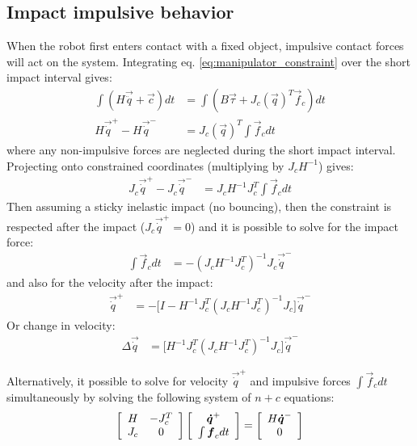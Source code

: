 \subsection{Impact impulsive behavior}
\label{sec:impact}
%
When the robot first enters contact with a fixed object, impulsive contact forces will act on the system. Integrating eq. \eqref{eq:manipulator_constraint} over the short impact interval gives:
%
\begin{align}
\int{ ( H \vec{\ddot{q}} + \vec{c} ) dt } &= \int{ ( B \vec{\tau} + J_c( \vec{ q } )^T  \vec{f}_c ) dt } \\
H \vec{\dot{q}}^+ - H \vec{\dot{q}}^- &= J_c( \vec{ q } )^T  \int{  \vec{f}_c dt }
\label{eq:manipulator_impact}
\end{align}
%
where any non-impulsive forces are neglected during the short impact interval. Projecting onto constrained coordinates (multiplying by $J_c H^{-1}$) gives:
%
\begin{align}
J_c \vec{\dot{q}}^+ - J_c \vec{\dot{q}}^- &= J_c H^{-1} J_c^T  \int{  \vec{f}_c dt }
\label{eq:manipulator_impact2}
\end{align}
%
Then assuming a sticky inelastic impact (no bouncing), then the constraint is respected after the impact ($J_c \vec{\dot{q}}^+=0$) and it is possible to solve for the impact force:
%
\begin{align}
\int{  \vec{f}_c dt } &= - \left( J_c H^{-1} J_c^T \right)^{-1}  J_c \vec{\dot{q}}^-
\label{eq:manipulator_impact_force}
\end{align}
%
and also for the velocity after the impact:
%
\begin{align}
\vec{\dot{q}}^+ &= - \Big[ I - H^{-1} J_c^T \left( J_c H^{-1} J_c^T \right)^{-1} J_c \Big] \vec{\dot{q}}^-
\label{eq:manipulator_impact_velocity}
\end{align}
%
Or change in velocity:
%
\begin{align}
\Delta \vec{\dot{q}} &=  \Big[ H^{-1} J_c^T \left( J_c H^{-1} J_c^T \right)^{-1} J_c \Big] \vec{\dot{q}}^-
\label{eq:manipulator_impact_velocity_delta}
\end{align}
%

Alternatively, it possible to solve for velocity $\vec{\dot{q}}^+$ and impulsive forces $\int{ \vec{f}_c dt }$ simultaneously by solving the following system of $n+c$ equations:
%
\begin{align}
\left[ \begin{array}{c c } 	H & -J_c^T  \\ J_c 	& 0  	\end{array} \right] \left[ \begin{array}{c} \vec{\dot{q}}^+  \\ \int{ \vec{f}_c dt }\end{array} \right] = \left[ \begin{array}{c}  	H \vec{\dot{q}}^-   \\ 0  \end{array} \right]
\label{eq:manipulator_impact_eom}
\end{align}


